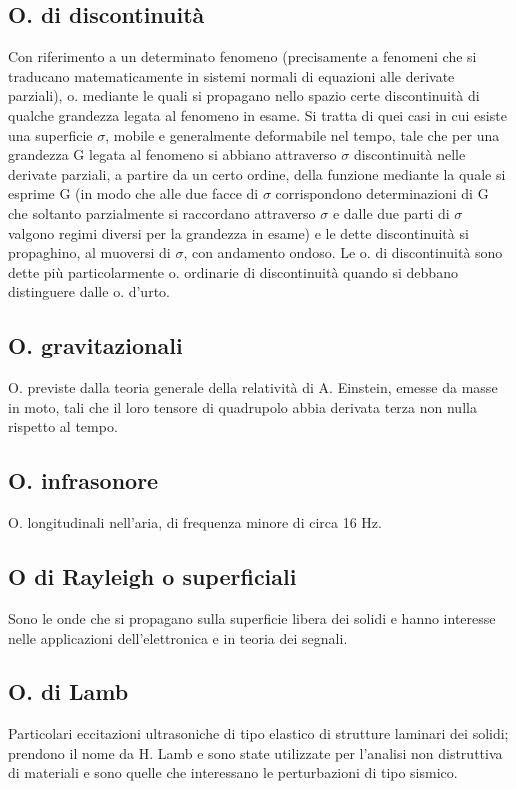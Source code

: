 \documentclass[a4paper]{article}
\begin{document}
\subsection{O. di discontinuità}
Con riferimento a un determinato fenomeno (precisamente a fenomeni che si traducano matematicamente in sistemi normali di equazioni alle derivate parziali), o. mediante le quali si propagano nello spazio certe discontinuità di qualche grandezza legata al fenomeno in esame. Si tratta di quei casi in cui esiste una superficie $\sigma$, mobile e generalmente deformabile nel tempo, tale che per una grandezza G legata al fenomeno si abbiano attraverso $\sigma$ discontinuità nelle derivate parziali, a partire da un certo ordine, della funzione mediante la quale si esprime G (in modo che alle due facce di $\sigma$ corrispondono determinazioni di G che soltanto parzialmente si raccordano attraverso $\sigma$ e dalle due parti di $\sigma$ valgono regimi diversi per la grandezza in esame) e le dette discontinuità si propaghino, al muoversi di $\sigma$, con andamento ondoso. Le o. di discontinuità sono dette più particolarmente o. ordinarie di discontinuità quando si debbano distinguere dalle o. d’urto. 
 
\subsection{O. gravitazionali}
O. previste dalla teoria generale della relatività di A. Einstein, emesse da masse in moto, tali che il loro tensore di quadrupolo abbia derivata terza non nulla rispetto al tempo. 

\subsection{O. infrasonore} 
O. longitudinali nell’aria, di frequenza minore di circa 16 Hz. 

\subsection{O di Rayleigh o superficiali}
Sono le onde che si propagano sulla superficie libera dei solidi e hanno interesse nelle applicazioni dell’elettronica e in teoria dei segnali. 

\subsection{O. di Lamb}
Particolari eccitazioni ultrasoniche di tipo elastico di strutture laminari dei solidi; prendono il nome da H. Lamb e sono state utilizzate per l’analisi non distruttiva di materiali e sono quelle che interessano le perturbazioni di tipo sismico. 
\end{document}

